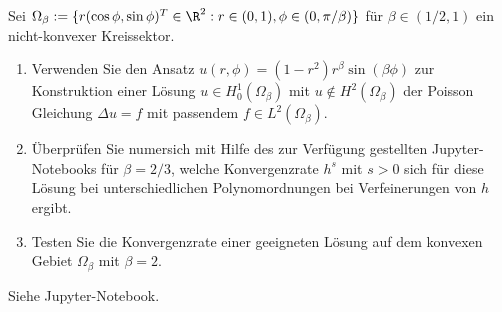 
\begin{exercise}

Sei $\Omega_\beta := \{r(\cos \phi, \sin \phi)^T \in \R^2: r \in (0,1), \phi \in (0, \pi / \beta)\}$
für $\beta \in (1/2,1)$ ein nicht-konvexer Kreissektor.
\begin{enumerate}[label = \textbf{(\alph*)}]
  \item Verwenden Sie den Ansatz $u(r,\phi) = (1-r^2)r^\beta \sin(\beta \phi)$ zur Konstruktion
  einer Lösung $u \in H^1_0(\Omega_\beta)$ mit $u \notin H^2(\Omega_\beta)$ der Poisson Gleichung
  $\Delta u = f$ mit passendem $f \in L^2(\Omega_\beta)$.
  \item Überprüfen Sie numersich mit Hilfe des zur Verfügung gestellten Jupyter-Notebooks für
  $\beta = 2/3$, welche Konvergenzrate $h^s$ mit $s > 0$ sich für diese Lösung bei unterschiedlichen
  Polynomordnungen bei Verfeinerungen von $h$ ergibt.
  \item Testen Sie die Konvergenzrate einer geeigneten Lösung auf dem konvexen Gebiet $\Omega_\beta$ mit $\beta = 2$.
\end{enumerate}

\end{exercise}


\begin{solution}

Siehe Jupyter-Notebook.

\end{solution}

